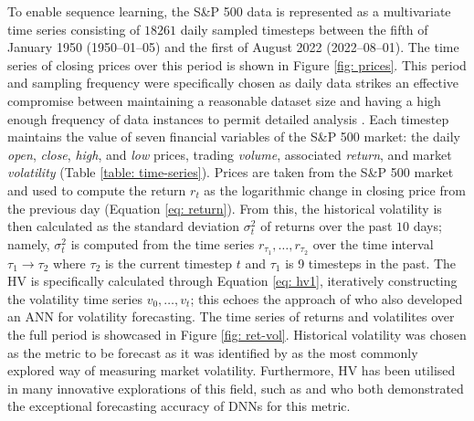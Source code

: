 \documentclass[a4paper, 11pt]{report}
\begin{document}
    To enable sequence learning, the S\&P 500 data is represented as a multivariate time series consisting of $18261$ daily sampled timesteps between the fifth of January 1950 (1950--01--05) and the first of August 2022 (2022--08--01). The time series of closing prices over this period is shown in Figure \ref{fig: prices}. This period and sampling frequency were specifically chosen as daily data strikes an effective compromise between maintaining a reasonable dataset size and having a high enough frequency of data instances to permit detailed analysis \citep{rodikov-2022}. Each timestep maintains the value of seven financial variables of the S\&P 500 market: the daily \emph{open}, \emph{close}, \emph{high}, and \emph{low} prices, trading \emph{volume}, associated \emph{return}, and market \emph{volatility} (Table \ref{table: time-series}). Prices are taken from the S\&P 500 market and used to compute the return $r_t$ as the logarithmic change in closing price from the previous day (Equation \ref{eq: return}). From this, the historical volatility is then calculated as the standard deviation $\sigma_{t}^2$ of returns over the past $10$ days; namely, $\sigma_{t}^2$ is computed from the time series $r_{\tau_1}, \ldots, r_{\tau_2}$ over the time interval $\tau_1 \to \tau_2$ where $\tau_2$ is the current timestep $t$ and $\tau_1$ is 9 timesteps in the past. The HV is specifically calculated through Equation \ref{eq: hv1}, iteratively constructing the volatility time series $v_0, \ldots, v_t$; this echoes the approach of \citet{lahmiri-2017} who also developed an ANN for volatility forecasting. The time series of returns and volatilites over the full period is showcased in Figure \ref{fig: ret-vol}. Historical volatility was chosen as the metric to be forecast as it was identified by \citet{ge-2022} as the most commonly explored way of measuring market volatility. Furthermore, HV has been utilised in many innovative explorations of this field, such as \citet{rahimikia-2020} and \citet{rodikov-2022} who both demonstrated the exceptional forecasting accuracy of DNNs for this metric.
\end{document}
